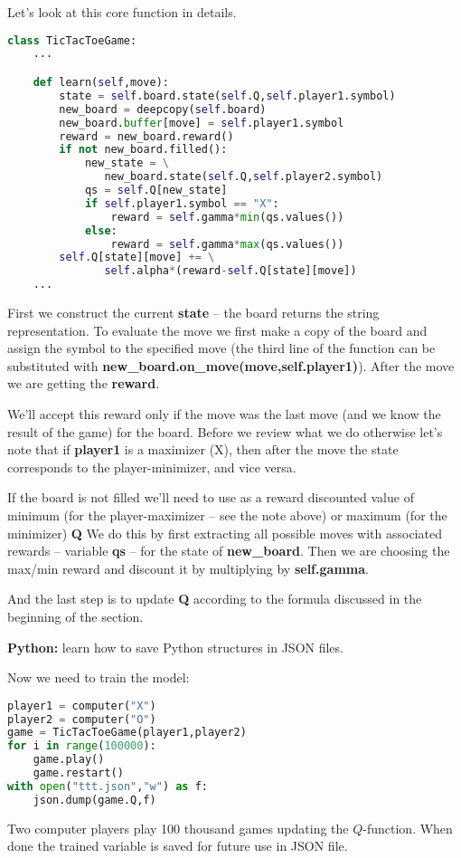 Let's look at this core function in details.
\begin{lstlisting}[language=Python,style=codelst2,caption={Tic-Tac-Toe: Q-learning, learning a move}]
class TicTacToeGame:
    ...

    def learn(self,move):
        state = self.board.state(self.Q,self.player1.symbol)
        new_board = deepcopy(self.board)
        new_board.buffer[move] = self.player1.symbol
        reward = new_board.reward()
        if not new_board.filled():
            new_state = \
               new_board.state(self.Q,self.player2.symbol)
            qs = self.Q[new_state]
            if self.player1.symbol == "X":
                reward = self.gamma*min(qs.values())
            else:
                reward = self.gamma*max(qs.values())
        self.Q[state][move] += \
               self.alpha*(reward-self.Q[state][move])
    ...
\end{lstlisting}
First we construct the
current \textbf{state} -- the board returns the string representation.
To evaluate the move we first make a copy of the board and assign
the symbol to the specified move (the third line of the function can be
substituted with \textbf{new\_board.on\_move(move,self.player1)}).
After the move we are getting the \textbf{reward}.

We'll accept this reward only if the move was the last move
(and we know the result of the game) for the board.
Before we review what we do otherwise let's note that if
\textbf{player1} is a maximizer (X), then after the move the state
corresponds to the player-minimizer, and vice versa.

If the board is not filled we'll need to use as a reward
discounted value of minimum (for the player-maximizer --
see the note above) or
maximum (for the minimizer) \textbf{Q}
We do this by first extracting all possible moves with
associated rewards -- variable \textbf{qs} -- for the state of
\textbf{new\_board}. Then we are choosing the max/min reward
and discount it by multiplying by \textbf{self.gamma}.

And the last step is to update \textbf{Q} according to the
formula discussed in the beginning of the section.

\begin{tcolorbox}
\textbf{Python:} learn how to save Python structures
in JSON files. 
\end{tcolorbox}

Now we need to train the model:

\begin{lstlisting}[language=Python,style=codelst2,caption={Tic-Tac-Toe: Q-learning, training - computer against computer}]
player1 = computer("X")
player2 = computer("O")
game = TicTacToeGame(player1,player2)
for i in range(100000):
    game.play()
    game.restart()
with open("ttt.json","w") as f:
    json.dump(game.Q,f)
\end{lstlisting}
Two computer players play 100 thousand games updating the $Q$-function.
When done the trained variable is saved for future use in JSON file.


